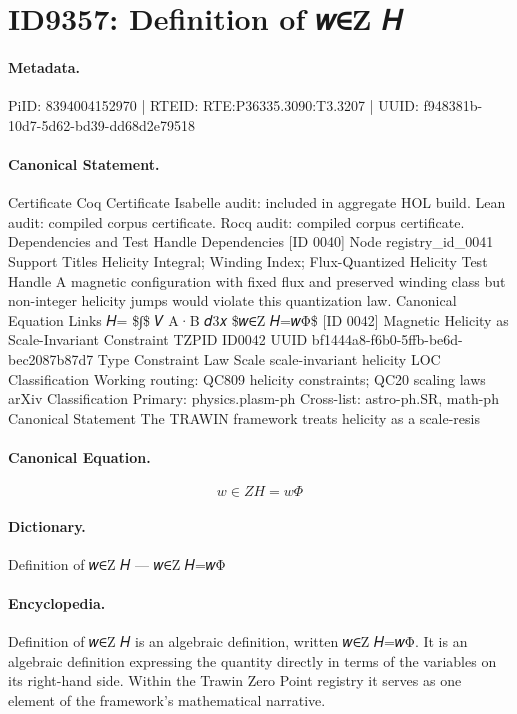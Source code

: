 \section*{ID9357: Definition of 𝑤∈Z 𝐻}
\paragraph{Metadata.}
PiID: 8394004152970 | RTEID: RTE:P36335.3090:T3.3207 | UUID: f948381b-10d7-5d62-bd39-dd68d2e79518

\paragraph{Canonical Statement.}
Certificate Coq Certificate Isabelle audit: included in aggregate HOL build. Lean audit: compiled corpus certificate. Rocq audit: compiled corpus certificate. Dependencies and Test Handle Dependencies [ID 0040] Node registry\_id\_0041 Support Titles Helicity Integral; Winding Index; Flux-Quantized Helicity Test Handle A magnetic configuration with fixed flux and preserved winding class but non-integer helicity jumps would violate this quantization law. Canonical Equation Links 𝐻= \$∫\$ 𝑉 A·B 𝑑3𝑥 \$𝑤∈Z 𝐻=𝑤Φ\$ [ID 0042] Magnetic Helicity as Scale-Invariant Constraint TZPID ID0042 UUID bf1444a8-f6b0-5ffb-be6d-bec2087b87d7 Type Constraint Law Scale scale-invariant helicity LOC Classification Working routing: QC809 helicity constraints; QC20 scaling laws arXiv Classification Primary: physics.plasm-ph Cross-list: astro-ph.SR, math-ph Canonical Statement The TRAWIN framework treats helicity as a scale-resis

\paragraph{Canonical Equation.}
\[
𝑤∈Z 𝐻=𝑤Φ
\]

\paragraph{Dictionary.}
Definition of 𝑤∈Z 𝐻 — 𝑤∈Z 𝐻=𝑤Φ

\paragraph{Encyclopedia.}
Definition of 𝑤∈Z 𝐻 is an algebraic definition, written 𝑤∈Z 𝐻=𝑤Φ. It is an algebraic definition expressing the quantity directly in terms of the variables on its right-hand side. Within the Trawin Zero Point registry it serves as one element of the framework's mathematical narrative.
